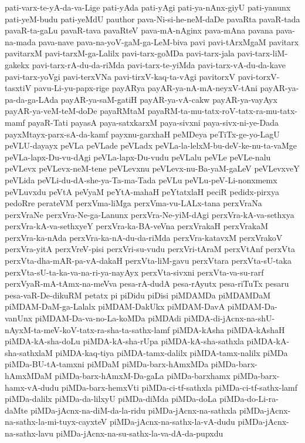 {pati-varx-te-yA-da-va-Lige
pati-yAda
pati-yAgi
pati-ya-nAnx-giyU
pati-yanunx
pati-yeM-budu
pati-yeMdU
pauthor
pava-Ni-si-he-neM-daDe
pavaRta
pavaR-tada
pavaR-ta-gaLu
pavaR-tava
pavaRteV
pava-mA-nAginx
pava-mAna
pavana
pava-na-mada
pava-nave
pava-na-yoV-gaM-ga-LeM-biva
pavi
pavi-tArxMgaM
pavitarx
pavitarxM
pavi-tarxM-ga-Lalilx
pavi-tarx-goMDa
pavi-tarx-jala
pavi-tarx-liM-gakekx
pavi-tarx-rA-du-da-riMda
pavi-tarx-te-yiMda
pavi-tarx-vA-du-da-kave
pavi-tarx-yoVgi
pavi-terxVNa
pavi-tirxV-kaq-ta-vAgi
pavitorxV
pavi-torxV-tasxtiV
pavu-Li-yu-papx-rige
payARya
payAR-ya-nA-mA-neyxV-tAni
payAR-ya-pa-da-ga-LAda
payAR-ya-saM-gatiH
payAR-ya-vA-cakw
payAR-ya-vayAyx
payAR-ya-veM-teM-doDe
payaRMtaM
payaRM-ta-mu-tatx-roV-tatx-ra-mu-tatx-mamf
payaR-Tati
payasA
paya-satxkarxM
paya-sivxni
paya-sivx-ni-ye-Dada
payxMtayx-parx-sA-da-kamf
payxnu-garxhaH
peMDeya
peTiTx-ge-yo-LagU
peVLU-dayayx
peVLa
peVLade
peVLadx
peVLa-la-lelxM-bu-deV-ke-nu-ta-vaMge
peVLa-lapx-Du-vu-dAgi
peVLa-lapx-Du-vudu
peVLalu
peVLe
peVLe-nalu
peVLevx
peVLevx-neM-tene
peVLevxnu
peVLevx-nu-Ba-yaM-gaLeV
peVLevxveY
peVLida
peVLi-du-dA-she-ya-Ta-ma-Tada
peVLu
peVLu-peV-Li-nonxmemx
peVLuvxdu
peVtA
peVyaM
peYtA-mahaH
peYtatxlaH
peciR
pedidx-pirxya
pedoRre
perateVM
perxVma-liMga
perxVma-vu-LALx-tana
perxVraNa
perxVraNe
perxVra-Ne-ga-Lanunx
perxVra-Ne-yiM-dAgi
perxVra-kA-va-sethxya
perxVra-kA-va-sethxyeY
perxVra-ka-BA-veVna
perxVrakaH
perxVrakaM
perxVra-ka-nAda
perxVra-ka-nA-du-da-riMda
perxVra-katavxM
perxVrakoV
perxVra-yitA
perxVreV-pisi
perxVri-su-vudu
perxVri-tAraM
perxVtAnf
perxVta
perxVta-dha-mAR-pa-vA-dakaH
perxVta-liM-gavu
perxVtara
perxVta-sU-taka
perxVta-sU-ta-ka-va-na-ri-ya-nayAyx
perxVta-sivxni
perxVta-va-su-rarf
perxVyaR-mA-tAmx-na-meVva
pesa-rA-dudA
pesa-rAyutx
pesa-riTuTx
pesaru
pesa-vaR-De-dikuRM
petatx
pi
piDidu
piDisi
piMDAMDa
piMDAMDaM
piMDAM-DaM-ga-Lalalx
piMDAM-DakUkx
piMDAM-DavA
piMDAM-Da-vanUnx
piMDAM-Da-va-no-La-koMDa
piMDAdi
piMDA-di-jAcnx-na-shU-nAyxM-ta-meV-koV-tatx-ra-sha-ta-sathx-lamf
piMDA-kAsha
piMDA-kAshaH
piMDA-kA-sha-doLu
piMDA-kA-sha-rUpa
piMDA-kA-sha-sathxla
piMDA-kA-sha-sathxlaM
piMDA-kaq-tiya
piMDA-tamx-dalilx
piMDA-tamx-nalilx
piMDa
piMDa-BU-tA-tamxni
piMDaM
piMDa-barx-hAmxMDa
piMDa-barx-hAmxMDaM
piMDa-barx-hAmxM-Da-gaLa
piMDa-barxhamx
piMDa-barx-hamx-vA-dudu
piMDa-barx-hemxVti
piMDa-ci-tf-sathxla
piMDa-ci-tf-sathx-lamf
piMDa-dalilx
piMDa-da-lilxyU
piMDa-diMda
piMDa-doLa
piMDa-do-Li-ra-daMte
piMDa-jAcnx-na-diM-da-la-ridu
piMDa-jAcnx-na-sathxla
piMDa-jAcnx-na-sathx-la-mi-tuyx-cayxteV
piMDa-jAcnx-na-sathx-la-vA-dudu
piMDa-jAcnx-na-sathx-lavu
piMDa-jAcnx-na-su-sathx-la-va-dA-da-pupxdu
}
